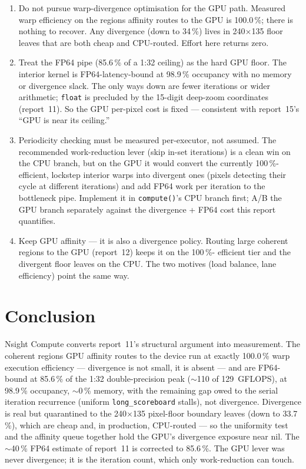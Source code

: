 \documentclass[
	english,
	letterpaper, oneside
]{article}
\begin{document}
\begin{enumerate}
  \item Do not pursue warp-divergence optimisation for the GPU path.
        Measured warp efficiency on the regions affinity routes to the GPU is
        100.0\,\%; there is nothing to recover. Any divergence (down to 34\,\%)
        lives in 240$\times$135 floor leaves that are both cheap and CPU-routed.
        Effort here returns zero.
  \item Treat the FP64 pipe (85.6\,\% of a 1:32 ceiling) as the hard GPU
        floor. The interior kernel is FP64-latency-bound at 98.9\,\% occupancy
        with no memory or divergence slack. The only ways down are fewer
        iterations or wider arithmetic; \texttt{float} is precluded by the
        15-digit deep-zoom coordinates (report~11). So the GPU per-pixel cost is
        fixed --- consistent with report~15's ``GPU is near its ceiling.''
  \item Periodicity checking must be measured per-executor, not assumed.
        The recommended work-reduction lever (skip in-set iterations) is a clean
        win on the CPU branch, but on the GPU it would convert the currently
        100\,\%-efficient, lockstep interior warps into divergent ones (pixels
        detecting their cycle at different iterations) and add FP64 work
        per iteration to the bottleneck pipe. Implement it in \texttt{compute()}'s
        CPU branch first; A/B the GPU branch separately against the divergence +
        FP64 cost this report quantifies.
  \item Keep GPU affinity --- it is also a divergence policy. Routing
        large coherent regions to the GPU (report~12) keeps it on the 100\,\%-
        efficient tier and the divergent floor leaves on the CPU. The two motives
        (load balance, lane efficiency) point the same way.
\end{enumerate}

\section{Conclusion}

Nsight Compute converts report~11's structural argument into measurement. The
coherent regions GPU affinity routes to the device run at exactly
100.0\,\% warp execution efficiency --- divergence is not small, it is absent ---
and are FP64-bound at 85.6\,\% of the 1:32 double-precision peak
($\sim$110 of 129~GFLOPS), at 98.9\,\% occupancy, $\sim$0\,\% memory, with the
remaining gap owed to the serial iteration recurrence (uniform
\texttt{long\_scoreboard} stalls), not divergence. Divergence is real but
quarantined to the 240$\times$135 pixel-floor boundary leaves (down to 33.7\,\%),
which are cheap and, in production, CPU-routed --- so the uniformity test and the
affinity queue together hold the GPU's divergence exposure near nil. The
$\sim$40\,\% FP64 estimate of report~11 is corrected to 85.6\,\%. The GPU lever
was never divergence; it is the iteration count, which only work-reduction can
touch.
\end{document}
